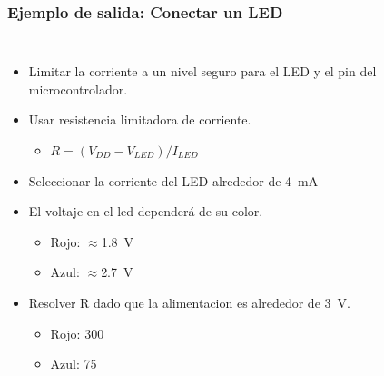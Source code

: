 \documentclass[10.5pt,scale=1.0,t,aspectratio=169,hyperref={pdfpagelabels=false}]{beamer}
\begin{document}
\begin{frame}
	\frametitle{Ejemplo de salida: Conectar un LED}
	\begin{columns}
		\begin{itemize}
			\item Limitar la corriente a un nivel seguro para el LED y el pin del microcontrolador.
			\item Usar resistencia limitadora de corriente. 
			\begin{itemize}
				\item $R = (V_{DD}-V_{LED})/I_{LED}$
			\end{itemize}
			\item Seleccionar la corriente del LED alrededor de \SI{4}{\milli\ampere}
			\item El voltaje en el led dependerá de su color.
			\begin{itemize}
				\item Rojo: $\approx$\SI{1.8}{\volt}
				\item Azul: $\approx$\SI{2.7}{\volt}
			\end{itemize}
			\item Resolver R dado que la alimentacion es alrededor de \SI{3}{\volt}.
			\begin{itemize}
				\item Rojo: \SI{300}{\Omega}
				\item Azul: \SI{75}{\Omega}
			\end{itemize}
		\end{itemize}
	

\end{columns}
\end{frame}
\end{document}
